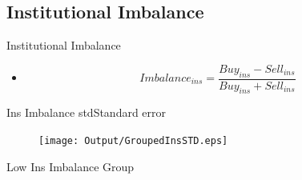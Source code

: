 \documentclass[handout]{beamer}
\begin{document}
%				

	
	
\subsection{Institutional Imbalance}
\begin{frame}{Institutional Imbalance}

\begin{itemize}
	\item \cite{seasholes2007predictable}
	
		\begin{equation*}
			Imbalance_{ins} = \frac{Buy_{ins} - Sell_{ins}}{Buy_{ins} + Sell_{ins}}
		\end{equation*}
	\begin{table}[htbp]
		\centering
		\resizebox{0.8\textwidth}{!}{
			
		}
		\label{tab:ImbalanceInsMeanSummary}
	\end{table}
		
	
	
\end{itemize}

\end{frame}


\begin{frame}{Ins Imbalance std}{Standard error}
	\begin{table}[htbp]
		\centering
		\resizebox{0.85\textwidth}{!}{
			
		}
		\label{tab:ImbalanceInsStdSummary}
	\end{table}



\begin{figure}[htbp]
	\centering
	\texttt{[image: Output/GroupedInsSTD.eps]}
	\label{fig:GroupedInsSTD}
\end{figure}
\end{frame}
\begin{frame}{Low Ins Imbalance Group}


				\begin{table}[htbp]
			\centering
			\resizebox{0.8\textwidth}{!}{
				
			}
		\end{table}
	
	\end{frame}
\end{document}
